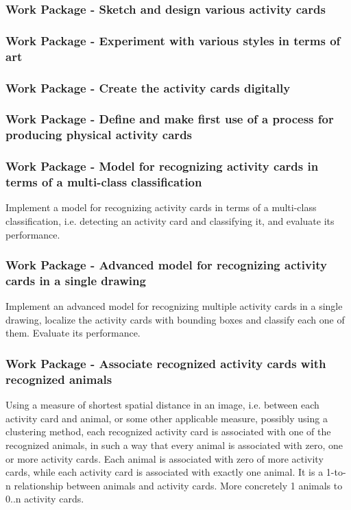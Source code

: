 \subsubsection{Work Package - Sketch and design various activity cards}
\subsubsection{Work Package - Experiment with various styles in terms of art}
\subsubsection{Work Package - Create the activity cards digitally}
\subsubsection{Work Package - Define and make first use of a process for producing physical activity cards}

\subsubsection{Work Package - Model for recognizing activity cards in terms of a multi-class classification}
Implement a model for recognizing activity cards in terms of a multi-class classification, i.e. detecting an activity card and classifying it, and evaluate its performance.

\subsubsection{Work Package - Advanced model for recognizing activity cards in a single drawing}
Implement an advanced model for recognizing multiple activity cards in a single drawing, localize the activity cards with bounding boxes and classify each one of them.
Evaluate its performance.

\subsubsection{Work Package - Associate recognized activity cards with recognized animals}
Using a measure of shortest spatial distance in an image, i.e. between each activity card and animal, or some other applicable measure, possibly using a clustering method, each recognized activity card is associated with one of the recognized animals, in such a way that every animal is associated with zero, one or more activity cards.
Each animal is associated with zero of more activity cards, while each activity card is associated with exactly one animal.
It is a 1-to-n relationship between animals and activity cards.
More concretely 1 animals to 0..n activity cards.

